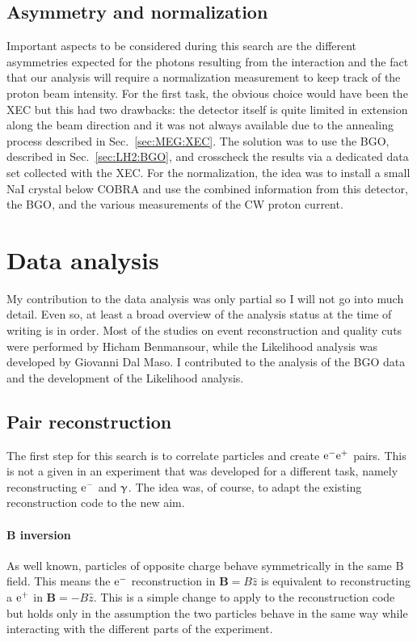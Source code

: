 \begin{refsection}
    \subsection{Asymmetry and normalization}
        Important aspects to be considered during this search are the different asymmetries expected for the photons resulting from the interaction and the fact that our analysis will require a normalization measurement to keep track of the proton beam intensity.
        For the first task, the obvious choice would have been the XEC but this had two drawbacks: the detector itself is quite limited in extension along the beam direction and it was not always available due to the annealing process described in Sec.~\ref{sec:MEG:XEC}.
        The solution was to use the BGO, described in Sec.~\ref{sec:LH2:BGO}, and crosscheck the results via a dedicated data set collected with the XEC.
        For the normalization, the idea was to install a small NaI crystal below COBRA and use the combined information from this detector, the BGO, and the various measurements of the CW proton current.

\section{Data analysis}
    My contribution to the data analysis was only partial so I will not go into much detail. 
    Even so, at least a broad overview of the analysis status at the time of writing is in order.
    Most of the studies on event reconstruction and quality cuts were performed by Hicham Benmansour, while the Likelihood analysis was developed by Giovanni Dal Maso. 
    I contributed to the analysis of the BGO data and the development of the Likelihood analysis.
    
    \subsection{Pair reconstruction}
        The first step for this search is to correlate particles and create $\text{e}^- \text{e}^+$ pairs. 
        This is not a given in an experiment that was developed for a different task, namely reconstructing $\text{e}^-$ and $\upgamma$. 
        The idea was, of course, to adapt the existing reconstruction code to the new aim.
        
        \paragraph{\textbf{B} inversion}
        As well known, particles of opposite charge behave symmetrically in the same B field.
        This means the $\text{e}^-$ reconstruction in $\textbf{B}=B\hat{z}$ is equivalent to reconstructing a $\text{e}^+$ in $\textbf{B}=-B\hat{z}$.
        This is a simple change to apply to the reconstruction code but holds only in the assumption the two particles behave in the same way while interacting with the different parts of the experiment.
        

\end{refsection}
